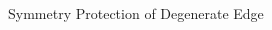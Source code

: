 \begin{frame}{Symmetry Protection of Degenerate Edge}
\vskip-1.5cm
\begin{columns}[T]
    \begin{column}[T]{.5\textwidth}
    \end{column}
    \begin{column}[T]{.5\textwidth}
    \end{column}
\end{columns}
\end{frame}